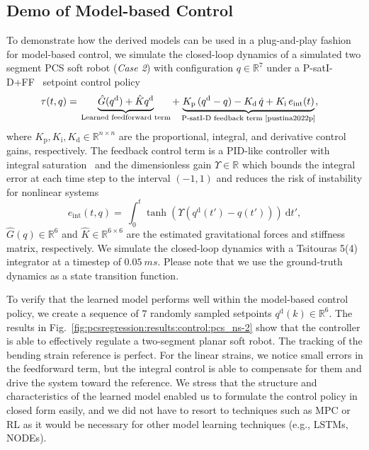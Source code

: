 \subsection{Demo of Model-based Control}
To demonstrate how the derived models can be used in a plug-and-play fashion for model-based control, we simulate the closed-loop dynamics of a simulated two segment \gls{PCS} soft robot (\emph{Case 2}) with configuration $q \in \mathbb{R}^7$ under a P-satI-D+FF~\cite{della2023model, stolzle2024experimental, stolzle2024input} setpoint control policy
\begin{equation}
\begin{split}
    \tau(t, q) =& \: \underbrace{\hat{G}(q^\mathrm{d})+\hat{K}q^\mathrm{d}}_{\text{Learned feedforward term}} + \underbrace{K_\mathrm{p} \, (q^\mathrm{d} - q) - K_\mathrm{d} \, \dot{q} + K_\mathrm{i} \, e_\mathrm{int}(t) }_{\text{P-satI-D feedback term~\cite{pustina2022p}}},
\end{split}
\end{equation}
where $K_\mathrm{p}, K_\mathrm{i}, K_\mathrm{d} \in \mathbb{R}^{n \times n}$ are the proportional, integral, and derivative control gains, respectively.
The feedback control term is a PID-like controller with integral saturation~\cite{pustina2022p} and the dimensionless gain $\Upsilon \in \mathbb{R}$ which bounds the integral error at each time step to the interval $(-1, 1)$ and reduces the risk of instability for nonlinear systems
\begin{equation}
    e_\mathrm{int}(t, q) = \:  \int_0^t \tanh(\Upsilon (q^\mathrm{d}(t') - q(t'))) \: \mathrm{d}t',
\end{equation}
$\hat{G}(q) \in \mathbb{R}^{6}$ and $\hat{K} \in \mathbb{R}^{6 \times 6}$ are the estimated gravitational forces and stiffness matrix, respectively.
We simulate the closed-loop dynamics with a Tsitouras 5(4) integrator at a timestep of $\SI{0.05}{ms}$.
Please note that we use the ground-truth dynamics as a state transition function.

To verify that the learned model performs well within the model-based control policy, we create a sequence of $7$ randomly sampled setpoints $q^\mathrm{d}(k) \in \mathbb{R}^6$. %
The results in Fig.~\ref{fig:pcsregression:results:control:pcs_ns-2} show that the controller is able to effectively regulate a two-segment planar soft robot.%
The tracking of the bending strain reference is perfect. For the linear strains, we notice small errors in the feedforward term, but the integral control is able to compensate for them and drive the system toward the reference.
We stress that the structure and characteristics of the learned model enabled us to formulate the control policy in closed form easily, and we did not have to resort to techniques such as \gls{MPC} or \gls{RL} as it would be necessary for other model learning techniques (e.g., \glspl{LSTM}, \glspl{NODE}).